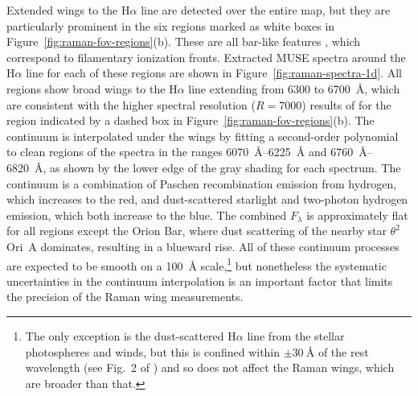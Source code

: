 \documentclass[times]{aastex63}
\def\th#1#2{\(\theta^{#1}\)\,Ori~#2}
\newcommand\ha{\ensuremath{\text{H}\alpha}}
\begin{document}
Extended wings to the \ha{} line are detected over the entire map, but
they are particularly prominent in the six regions marked as white
boxes in Figure~\ref{fig:raman-fov-regions}(b).  These are all
bar-like features \citep{ODell:2000a, Garcia-Diaz:2007a}, which
correspond to filamentary ionization fronts.  Extracted MUSE spectra
around the \ha{} line for each of these regions are shown in
Figure~\ref{fig:raman-spectra-1d}.  All regions show broad wings to
the \ha{} line extending from \num{6300} to \SI{6700}{\angstrom},
which are consistent with the higher spectral resolution
(\(R = 7000\)) results of \citet{Dopita:2016a} for the region
indicated by a dashed box in Figure~\ref{fig:raman-fov-regions}(b).
The continuum is interpolated under the wings by fitting a
second-order polynomial to clean regions of the spectra in the ranges
\SIrange{6070}{6225}{\angstrom} and \SIrange{6760}{6820}{\angstrom},
as shown by the lower edge of the gray shading for each spectrum.  The
continuum is a combination of Paschen recombination emission from
hydrogen, which increases to the red, and dust-scattered starlight and
two-photon hydrogen emission, which both increase to the blue.  The
combined \(F_\lambda\) is approximately flat for all regions except the
Orion Bar, where dust scattering of the nearby star \th2A{} dominates,
resulting in a blueward rise.  All of these continuum processes are
expected to be smooth on a \SI{100}{\angstrom} scale,\footnote{The
  only exception is the dust-scattered \ha{} line from the stellar
  photospheres and winds, but this is confined within
  \(\pm \SI{30}{\angstrom}\) of the rest wavelength (see Fig.~2 of
  \citealp{Simon-Diaz:2006b}) and so does not affect the Raman wings,
  which are broader than that.}  but nonetheless the systematic
uncertainties in the continuum interpolation is an important factor
that limits the precision of the Raman wing measurements.
\end{document}
